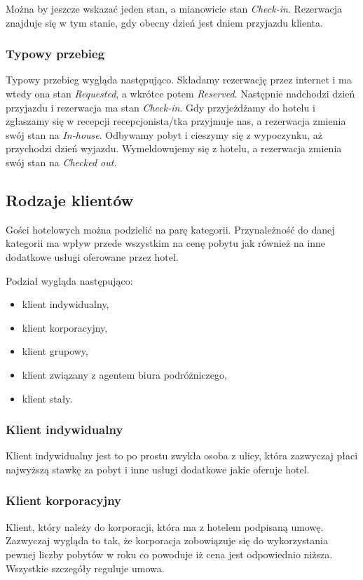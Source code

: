 \documentclass[a4paper,onecolumn,oneside,11pt,wide,floatssmall]{mwrep}
\theoremstyle{definition}
\theoremstyle{plain}%
\theoremstyle{remark}
\begin{document}
Można by jeszcze wskazać jeden stan, a mianowicie stan \emph{Check-in}.
Rezerwacja znajduje się w tym stanie, gdy obecny dzień jest dniem przyjazdu
klienta.

\subsubsection{Typowy przebieg}
Typowy przebieg wygląda następująco. Składamy rezerwację przez internet i ma
wtedy ona stan \emph{Requested}, a wkrótce potem \emph{Reserved}. Następnie
nadchodzi dzień przyjazdu i rezerwacja ma stan \emph{Check-in}. Gdy przyjeżdżamy
do hotelu i zgłaszamy się w recepcji recepcjonista/tka przyjmuje nas, a
rezerwacja zmienia swój stan na \emph{In-house}. Odbywamy pobyt i cieszymy się z
wypoczynku, aż przychodzi dzień wyjazdu. Wymeldowujemy się z hotelu, a
rezerwacja zmienia swój stan na \emph{Checked out}.

\subsection{Rodzaje klientów}
\label{rodzaje_klientow}
Gości hotelowych można podzielić na parę kategorii. Przynależność do danej
kategorii ma wpływ przede wszystkim na cenę pobytu jak również na inne 
dodatkowe usługi oferowane przez hotel. 

Podział wygląda następująco:
\begin{itemize}
  \item klient indywidualny,
  \item klient korporacyjny,
  \item klient grupowy,
  \item klient związany z agentem biura podróżniczego,
  \item klient stały.
\end{itemize}

\subsubsection{Klient indywidualny}
Klient indywidualny jest to po prostu zwykła osoba z ulicy, która zazwyczaj
płaci najwyższą stawkę za pobyt i inne usługi dodatkowe jakie oferuje hotel.

\subsubsection{Klient korporacyjny}
Klient, który należy do korporacji, która ma z hotelem podpisaną umowę.
Zazwyczaj wygląda to tak, że korporacja zobowiązuje się do wykorzystania 
pewnej liczby pobytów w roku co powoduje iż cena jest odpowiednio niższa.
Wszystkie szczegóły reguluje umowa.
\end{document}
